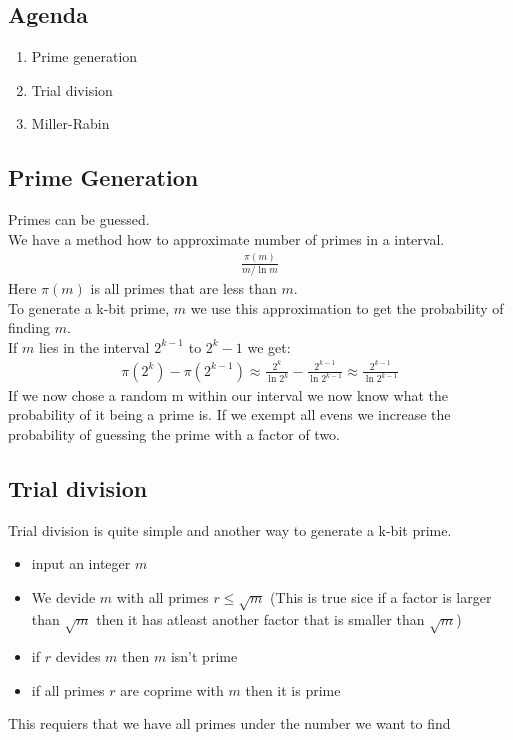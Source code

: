 

\subsection*{Agenda}
\begin{enumerate}
\item Prime generation
\item Trial division
\item Miller-Rabin
\end{enumerate}

\subsection{Prime Generation}
Primes can be guessed.\\
We have a method how to approximate number of primes in a interval.
\begin{align*}
\frac{\pi (m)}{m/\ln m}
\end{align*}
Here $\pi (m)$ is all primes that are less than $m$.\\
To generate a k-bit prime, $m$ we use this approximation to get the probability of finding $m$.\\ If $m$ lies in the interval $2^{k-1}$ to $2^k-1$ we get:
\begin{align*}
\pi (2^k)-\pi (2^{k-1})\approx \frac{2^k}{\ln 2^k}-\frac{2^{k-1}}{\ln 2^{k-1}}\approx \frac{2^{k-1}}{\ln 2^{k-1}}
\end{align*}
If we now chose a random m within our interval we now know what the probability of it being a prime is. If we exempt all evens we increase the probability of guessing the prime with a factor of two.
\subsection{Trial division}
Trial division is quite simple and another way to generate a k-bit prime.
\begin{itemize}
\item input an integer $m$
\item We devide $m$ with all primes $r\le \sqrt{m}$ (This is true sice if a factor is larger than $\sqrt{m}$ then it has atleast another factor that is smaller than $\sqrt{m}$)
\item if $r$ devides $m$ then $m$ isn't prime
\item if all primes $r$ are coprime with $m$ then it is prime
\end{itemize}
This requiers that we have all primes under the number we want to find

